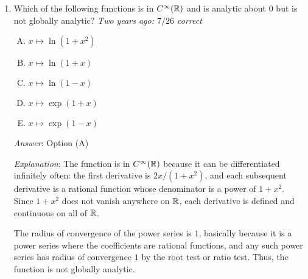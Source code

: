 \documentclass[10pt]{amsart}
\begin{document}
\begin{enumerate}
  {\em Answer}: Option (C)

  {\em Explanation}: This answer is explained more in the lecture
  notes.

  {\em Why the other options are wrong}:

  Option (A): This is in fact globlally analytic, and is given by the
  power series $1 - x^2/3! + x^4/5! - \dots$

  Option (B): This is not continuous at $0$. The left hand limit at
  $0$ is $+\infty$.

  Option (D): This is not continuous at $0$. The limit at $0$ is not
  defined.

  {\em Performance review}: $20$ out of $24$ got this. $2$ each chose
  (A) and (B).

  {\em Historical note (Math 153)}: $30$ out of $42$ got this. $5$ chose (D),
  $4$ chose (E), $2$ chose (B), $1$ chose (A).

  {\em Historical note (last year)}: $1$ out of $11$ got this correct. $5$
  chose (D), $2$ chose (B), $1$ each chose (A) and (E).

  {\em Historical note (two years ago)}: $3$ out of $26$ people got this
  correct. $11$ chose (D), $6$ each chose (A) and (E).

\item Which of the following functions is in $C^\infty(\mathbb{R})$ and is
  analytic about $0$ but is not globally analytic? {\em Two years ago:
  $7/26$ correct}
  \begin{enumerate}[(A)]
  \item $x \mapsto \ln(1 + x^2)$
  \item $x \mapsto \ln(1 + x)$
  \item $x \mapsto \ln(1 - x)$
  \item $x \mapsto \exp(1 + x)$
  \item $x \mapsto \exp(1 - x)$
  \end{enumerate}

  {\em Answer}: Option (A)

  {\em Explanation}: The function is in $C^\infty(\mathbb{R})$ because it can
  be differentiated infinitely often: the first derivative is $2x/(1 +
  x^2)$, and each subsequent derivative is a rational function whose
  denominator is a power of $1 + x^2$. Since $1 + x^2$ does not vanish
  anywhere on $\mathbb{R}$, each derivative is defined and continuous on all
  of $\mathbb{R}$.

  The radius of convergence of the power series is $1$, basically
  because it is a power series where the coefficients are rational
  functions, and any such power series has radius of convergence $1$
  by the root test or ratio test. Thus, the function is not globally
  analytic.


\end{enumerate}
\end{document}
